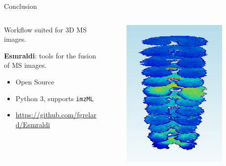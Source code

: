 \documentclass[10pt]{beamer}
\begin{document}
\begin{frame}{Conclusion}

  \begin{columns}
    \begin{column}{.8\textwidth}

      Workflow suited for 3D MS images.

      \vspace{0.2cm}
      \begin{spacing}{1.5}

        \textbf{Esmraldi}: tools for the fusion of MS images.
        \begin{itemize}
        \item Open Source
        \item Python 3, supports \texttt{imzML}
        \item \url{https://github.com/fgrelard/Esmraldi}
        \end{itemize}

      \end{spacing}
    \end{column}

    \begin{column}{.2\textwidth}
      \begin{figure}[ht]
        \centering
        \includegraphics[width=0.9\textwidth]{fig/3D_250DJ}
      \end{figure}


\end{column}
\end{columns}
\end{frame}
\end{document}
